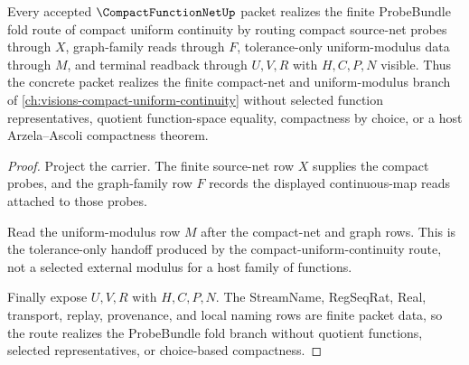 \begin{theorem}
\label{thm:compact-function-net-vision-realization}
Every accepted $\CompactFunctionNetUp$ packet realizes the finite ProbeBundle fold route of compact uniform continuity by routing compact source-net probes through $X$, graph-family reads through $F$, tolerance-only uniform-modulus data through $M$, and terminal readback through $U,V,R$ with $H,C,P,N$ visible. Thus the concrete packet realizes the finite compact-net and uniform-modulus branch of \autoref{ch:visions-compact-uniform-continuity} without selected function representatives, quotient function-space equality, compactness by choice, or a host Arzela--Ascoli compactness theorem.
\end{theorem}
\begin{proof}
Project the carrier. The finite source-net row $X$ supplies the compact probes, and the graph-family row $F$ records the displayed continuous-map reads attached to those probes.

Read the uniform-modulus row $M$ after the compact-net and graph rows. This is the tolerance-only handoff produced by the compact-uniform-continuity route, not a selected external modulus for a host family of functions.

Finally expose $U,V,R$ with $H,C,P,N$. The StreamName, RegSeqRat, Real, transport, replay, provenance, and local naming rows are finite packet data, so the route realizes the ProbeBundle fold branch without quotient functions, selected representatives, or choice-based compactness.
\end{proof}


\begin{closurestatus}{\CompactFunctionNetUp}
  \theoryclosure{\seedClosure}
  \formalstatus{\unformalizedV}
\end{closurestatus}
